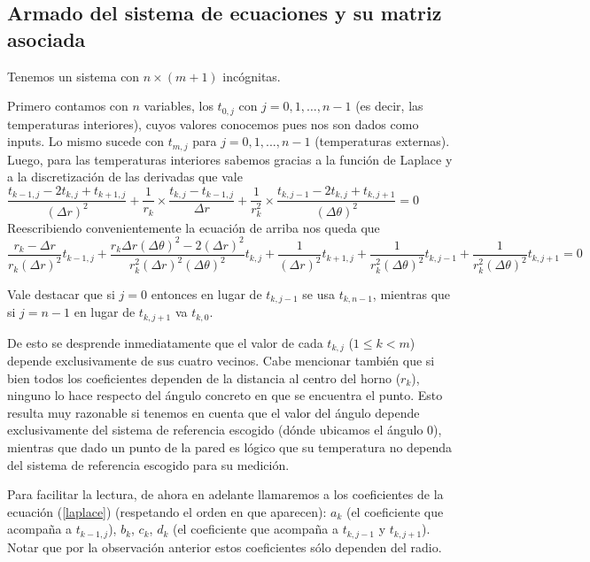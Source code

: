   
\subsection{Armado del sistema de ecuaciones y su matriz asociada}
Tenemos un sistema con $n\times(m+1)$ incógnitas.

Primero contamos con $n$ variables, los $t_{0,j}$ con $j = 0,1,\hdots, n-1$ (es decir, las temperaturas interiores), cuyos valores conocemos pues nos son dados como inputs. Lo mismo sucede con $t_{m, j}$ para $j = 0,1,..., n-1$ (temperaturas externas).
Luego, para las temperaturas interiores sabemos gracias a la función de Laplace y a la discretización de las derivadas que vale \\

$\dfrac{t_{k-1,j} - 2t_{k,j} + t_{k+1,j}}{(\Delta r)^2} 
+ \dfrac{1}{r_k} \times \dfrac{t_{k,j} - t_{k-1,j}}{\Delta r}
+ \dfrac{1}{r_{k}^2} \times \dfrac{t_{k,j-1} -2t_{k,j} + t_{k,j+1}}{(\Delta \theta)^2} = 0$\\

Reescribiendo convenientemente la ecuación de arriba nos queda que \\

\begin{equation}
\label{laplace}
\dfrac{r_k - \Delta r}{r_k (\Delta r)^2} t_{k-1, j} +
\dfrac{r_k \Delta r (\Delta \theta)^2 - 2(\Delta r)^2}{r_k^2 (\Delta r)^2 (\Delta \theta)^2} t_{k,j} +
\dfrac{1}{(\Delta r)^2} t_{k+1,j} +
\dfrac{1}{r_k^2(\Delta \theta)^2} t_{k, j-1} +
\dfrac{1}{r_k^2(\Delta \theta)^2} t_{k, j+1} = 0
\end{equation}

Vale destacar que si $j = 0$ entonces en lugar de $t_{k, j-1}$ se usa $t_{k, n-1}$, mientras que si $j = n-1$ en lugar de $t_{k, j+1}$ va $t_{k, 0}$.

De esto se desprende inmediatamente que el valor de cada $t_{k,j}$ ($1\leq k < m$) depende exclusivamente de sus cuatro vecinos. Cabe mencionar también que si bien todos los coeficientes dependen de la distancia al centro del horno ($r_k$), ninguno lo hace respecto del ángulo concreto en que se encuentra el punto. Esto resulta muy razonable si tenemos en cuenta que el valor del ángulo depende exclusivamente del sistema de referencia escogido (dónde ubicamos el ángulo 0), mientras que dado un punto de la pared es lógico que su temperatura no dependa del sistema de referencia escogido para su medición.

Para facilitar la lectura, de ahora en adelante llamaremos a los coeficientes de la ecuación (\ref{laplace}) (respetando el orden en que aparecen): $a_k$ (el coeficiente que acompaña a $t_{k-1, j}$), $b_k$, $c_k$, $d_k$ (el coeficiente que acompaña a $t_{k, j-1}$ y $t_{k, j+1}$). Notar que por la observación anterior estos coeficientes sólo dependen del radio.

